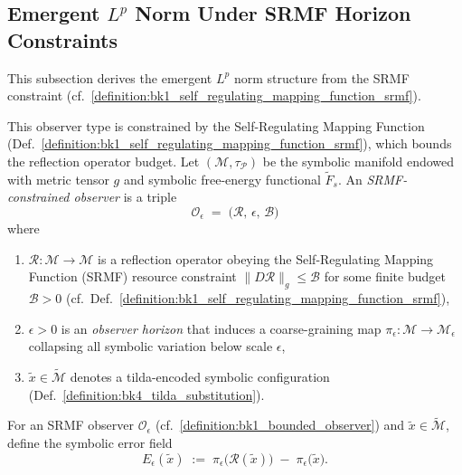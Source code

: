 \subsection[\texorpdfstring{Emergent $L^p$ Norm Under SRMF Horizon Constraints}{Emergent Lp Norm Under SRMF Horizon Constraints}]
{\texorpdfstring{Emergent $L^p$ Norm Under SRMF Horizon Constraints}
{Emergent Lp Norm Under SRMF Horizon Constraints}}
\label{subsec:bk7_emergent_lp_norm_under_srmf_horizon_constrain}
This subsection derives the emergent $L^p$ norm structure from the SRMF constraint (cf.~\ref{definition:bk1_self_regulating_mapping_function_srmf}).
\begin{definition}
\label{definition:bk7_srmfconstrained_observer}
This observer type is constrained by the Self-Regulating Mapping Function (Def.~\ref{definition:bk1_self_regulating_mapping_function_srmf}), which bounds the reflection operator budget.
Let $(\mathcal{M},\tau_{\mathcal{P}})$ be the symbolic manifold endowed with
metric tensor $g$ and symbolic free-energy functional $\tilde{F}_s$.
An \emph{SRMF-constrained observer} is a triple
\[
\mathcal{O}_{\epsilon} \;=\; \bigl( \mathcal{R},\, \epsilon,\, \mathcal{B} \bigr)
\]
where
\begin{enumerate}[label=(\roman*)]
  \item $\mathcal{R}\colon\mathcal{M}\!\to\!\mathcal{M}$ is a reflection operator
        obeying the Self-Regulating Mapping Function (SRMF) resource constraint
        \(\lVert D\mathcal{R}\rVert_g \le \mathcal{B}\) for some finite budget
        $\mathcal{B}>0$ (cf.~Def.~\ref{definition:bk1_self_regulating_mapping_function_srmf}),
  \item \(\epsilon > 0\) is an \emph{observer horizon} that induces a
        coarse-graining map
        \(
        \pi_{\epsilon}\colon \mathcal{M}\!\to\!\mathcal{M}_{\epsilon}
        \)
        collapsing all symbolic variation below scale $\epsilon$,
  \item $\tilde{x}\in\tilde{\mathcal{M}}$ denotes a
        tilda-encoded symbolic configuration
        (Def.~\ref{definition:bk4_tilda_substitution}).
\end{enumerate}
\end{definition}
\begin{definition}
\label{definition:bk7_observerrelative_symbolic_error_field}
For an SRMF observer $\mathcal{O}_{\epsilon}$ (cf.~\ref{definition:bk1_bounded_observer}) and
$\tilde{x}\in\tilde{\mathcal{M}}$, define the symbolic
error field
\[
E_{\epsilon}(\tilde{x}) \;:=\;
\pi_{\epsilon}\bigl(\mathcal{R}(\tilde{x})\bigr)
\;-\;
\pi_{\epsilon}\bigl(\tilde{x}\bigr).
\]
\end{definition}
